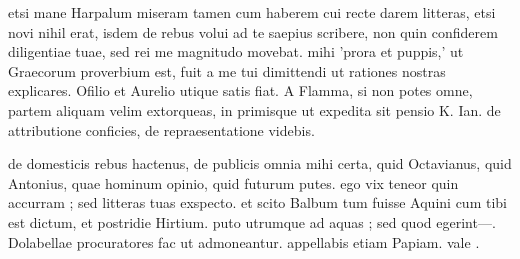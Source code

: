


 etsi mane Harpalum miseram tamen cum haberem cui recte darem litteras, etsi novi nihil erat, isdem de rebus volui ad te saepius scribere, non quin confiderem diligentiae tuae, sed rei me magnitudo movebat. mihi 'prora et puppis,' ut Graecorum proverbium est, fuit a me tui dimittendi ut rationes nostras explicares. Ofilio et Aurelio utique satis fiat. A Flamma, si non potes omne, partem aliquam velim extorqueas, in primisque ut expedita sit pensio K. Ian. de attributione conficies, de repraesentatione videbis.

 de domesticis rebus hactenus, de publicis omnia mihi certa, quid Octavianus, quid Antonius, quae hominum opinio, quid futurum putes. ego vix teneor quin accurram ; sed litteras tuas exspecto. et scito Balbum tum fuisse Aquini cum tibi est dictum, et postridie Hirtium. puto utrumque ad aquas ; sed quod egerint—. Dolabellae procuratores fac ut admoneantur. appellabis etiam Papiam. vale .
